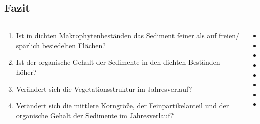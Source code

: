 \documentclass[xcolor=dvipsnames]{beamer}
\newcommand{\cmark}{\ding{51}}%
\newcommand{\xmark}{\ding{55}}%
\begin{document}
\subsection{Fazit}
\begin{frame}
\begin{columns}
\begin{column}{9.5cm}
\begin{enumerate}[<+->] 
\item Ist in dichten Makrophytenbeständen das Sediment feiner als auf freien/ spärlich besiedelten Flächen?
\item Ist der organische Gehalt der Sedimente in den dichten Beständen höher?
\item Verändert sich die Vegetationsstruktur im Jahresverlauf?
\item Verändert sich die mittlere Korngröße, der Feinpartikelanteil und der organische Gehalt der Sedimente im Jahresverlauf?
\end{enumerate}
\end{column}
\begin{column}{2.5cm}
\begin{itemize}
\item<1->[\cmark] 
\item<1->[] 
\item<2->[\cmark]
\item<2->[]
\item<3->[\cmark] 
\item<3->[]
\item<4->[\xmark]
\item<4->[]
\end{itemize}
\end{column}
\end{columns}
\end{frame}






\end{document}
